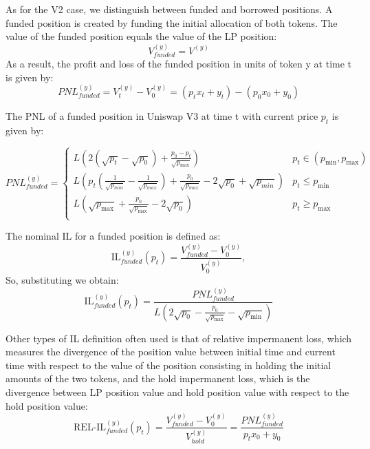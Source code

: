 \documentclass{article}
\begin{document}
As for the V2 case, we distinguish between funded and borrowed positions.
A funded position is created by funding the initial allocation of both tokens.
The value of the funded position equals the value of the LP position:
$$ V_{funded}^{(y)} = V^{(y)}$$
As a result, the profit and loss of the funded position in units of token y at time t is given by:
$$ PNL_{funded}^{(y)} = V_t^{(y)} - V_0^{(y)} =(p_tx_t + y_t)-(p_0x_0 + y_0) $$

The PNL of a funded position in Uniswap V3 at time t with current price $p_t$ is given by:

\begin{equation}
PNL_{funded}^{(y)} =
\begin{cases} 
L \left( 2(\sqrt{p_t}-\sqrt{p_0}) + \frac{p_0 - p_t}{\sqrt{p_{\max}}} \right )& p_t \in (p_{\min}, p_{\max}) \\
L \left( p_t(\frac{1}{\sqrt{p_{min}}}-\frac{1}{\sqrt{p_{max}}})+ \frac{p_0}{\sqrt{p_{max}}} - 2\sqrt{p_0} + \sqrt{p_{min}} \right )& p_t \leq p_{\min} \\
L \left( \sqrt{p_{\max}} + \frac{p_0}{\sqrt{p_{\max}}} - 2\sqrt{p_{0}} \right )& p_t \geq p_{\max} \\
\end{cases}
\label{pnl_funded^y}
\end{equation}

The nominal IL for a funded position is defined as:
$$\text{IL}_{funded}^{(y)}(p_t) = \frac{V_{funded}^{(y)} - V_0^{(y)}}{V_0^{(y)}},$$
So, substituting we obtain:
\begin{equation}
\text{IL}_{funded}^{(y)}(p_t)= \frac{PNL_{funded}^{(y)}}{ L \left( 2\sqrt{p_0} - \frac{p_0}{\sqrt{p_{\max}}} - \sqrt{p_{\min}} \right)}
\label{il_funded^y}
\end{equation}

Other types of IL definition often used is that of relative impermanent loss, which measures the divergence of the position value between initial time and current time with respect to the value of the position consisting in holding the initial amounts of the two tokens, and the hold impermanent loss, which is the divergence between LP position value and hold position value with respect to the hold position value:
\begin{equation}
\text{REL-IL}_{funded}^{(y)}(p_t)= \frac{V_{funded}^{(y)} - V_0^{(y)}}{V_{hold}^{(y)}}= \frac{PNL_{funded}^{(y)}}{p_tx_0 + y_0}
\label{rel_il_funded^y}
\end{equation}
\end{document}
